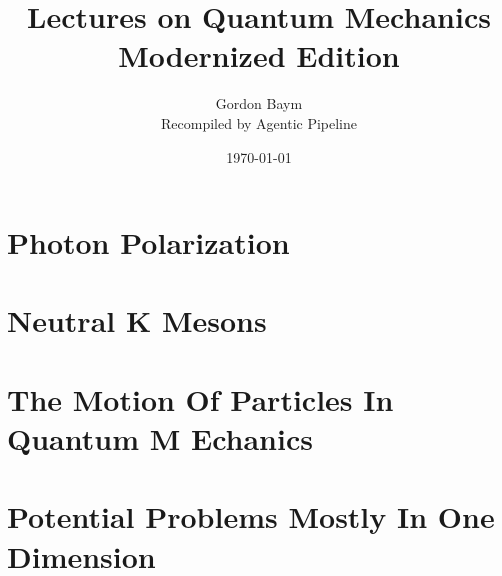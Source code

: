 \documentclass[11pt,twoside,openright]{book}
\title{Lectures on Quantum Mechanics\\ \large Modernized Edition}
\author{Gordon Baym \\ \small Recompiled by Agentic Pipeline}
\date{\today}
\begin{document}
\maketitle
\tableofcontents








\chapter{Photon Polarization}







\chapter{Neutral K Mesons}



\chapter{The Motion Of Particles In Quantum M Echanics}










\chapter{Potential Problems Mostly In One Dimension}












\end{document}
